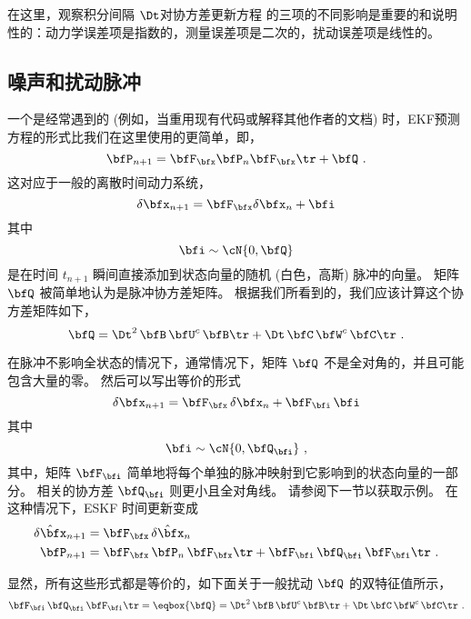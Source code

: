 在这里，观察积分间隔 $\Dt$对协方差更新方程 的三项的不同影响是重要的和说明性的：动力学误差项是指数的，测量误差项是二次的，扰动误差项是线性的。 


\subsection{噪声和扰动脉冲}
\label{sec:pertImpulses}

一个是经常遇到的 (例如，当重用现有代码或解释其他作者的文档) 时，EKF预测方程的形式比我们在这里使用的更简单，即，
%
\begin{equation}
\bfP_{n+1} = \bfF_\bfx\bfP_n\bfF_\bfx\tr + \bfQ~.
\end{equation}
%
这对应于一般的离散时间动力系统，
%
\begin{equation}
\delta\bfx_{n+1} = \bfF_\bfx\delta\bfx_n+\bfi
\end{equation}
%
其中
%
\begin{equation}
\bfi \sim \cN\{0,\bfQ\}
\end{equation}
%
是在时间 $t_{n+1}$ 瞬间直接添加到状态向量的随机 (白色，高斯) 脉冲的向量。  
矩阵 $\bfQ$ 被简单地认为是脉冲协方差矩阵。 
根据我们所看到的，我们应该计算这个协方差矩阵如下，
%
\begin{equation}
\bfQ = \Dt^2\,\bfB\,\bfU^c\,\bfB\tr + \Dt\,\bfC\,\bfW^c\,\bfC\tr~.
\end{equation}

在脉冲不影响全状态的情况下，通常情况下，矩阵 $\bfQ$ 不是全对角的，并且可能包含大量的零。 
然后可以写出等价的形式
%
\begin{equation}
\delta\bfx_{n+1} = \bfF_\bfx\,\delta\bfx_n+\bfF_\bfi\,\bfi
\end{equation}
%
其中
%
\begin{equation}
\bfi \sim \cN\{0,\bfQ_\bfi\}~,
\end{equation}
%
其中，矩阵 $\bfF_\bfi$ 简单地将每个单独的脉冲映射到它影响到的状态向量的一部分。 
相关的协方差 $\bfQ_\bfi$ 则更小且全对角线。 
请参阅下一节以获取示例。 
在这种情况下，ESKF 时间更新变成
%
\begin{align}
\hat{\delta\bfx}_{n+1} &= \bfF_\bfx\,\hat{\delta\bfx}_n \\
\bfP_{n+1} &= \bfF_\bfx\,\bfP_n\,\bfF_\bfx\tr + \bfF_\bfi\,\bfQ_\bfi\,\bfF_\bfi\tr~.
\end{align}
%


显然，所有这些形式都是等价的，如下面关于一般扰动 $\bfQ$ 的双特征值所示，
%
\begin{equation}
\bfF_\bfi\,\bfQ_\bfi\,\bfF_\bfi\tr = \eqbox{\bfQ} =  \Dt^2\,\bfB\,\bfU^c\,\bfB\tr + \Dt\,\bfC\,\bfW^c\,\bfC\tr~.
\end{equation}



